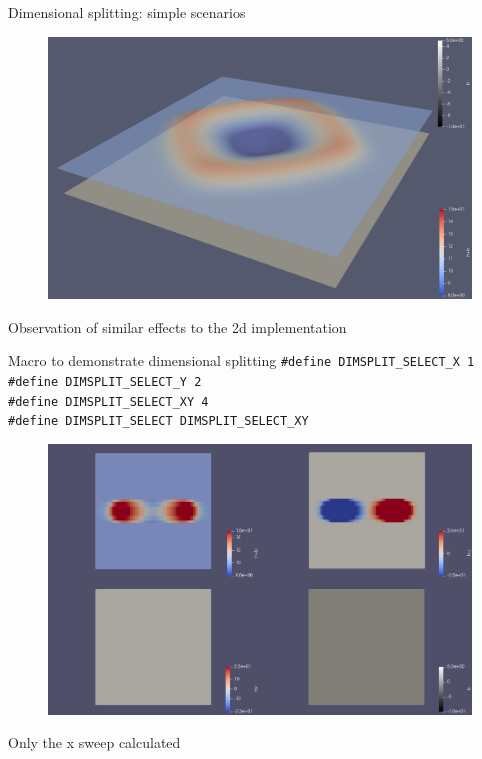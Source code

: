 \documentclass[shortpres]{beamer}
\newcommand{\imgfullscale}{0.75}
\begin{document}
\begin{frame}{Dimensional splitting: simple scenarios}
	\begin{figure}
			\includegraphics[clip, width=\imgfullscale\linewidth]{img/3d_bathy.png}
	\end{figure}
	Observation of similar effects to the 2d implementation
\end{frame}

\begin{frame}{Macro to demonstrate dimensional splitting}
	\texttt{\#define DIMSPLIT\_SELECT\_X 1\\
		\#define DIMSPLIT\_SELECT\_Y 2\\
		\#define DIMSPLIT\_SELECT\_XY 4\\
		\#define DIMSPLIT\_SELECT DIMSPLIT\_SELECT\_XY}
	\begin{figure}
		\includegraphics[clip, width=0.5\linewidth]{img/2d_bathy_x.png}
	\end{figure}
	Only the x sweep calculated
\end{frame}
\end{document}
